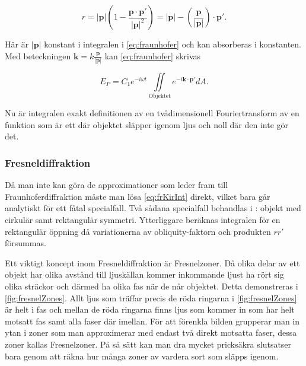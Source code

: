 \documentclass[a4paper]{article}
\begin{document}
\begin{equation}
	r = |\boldsymbol{p}|\left( 1 - \frac{\boldsymbol{p}\cdot\boldsymbol{p'}}{|\boldsymbol{p}|^2} \right) = |\boldsymbol{p}| - \left(\frac{\boldsymbol{p}}{|\boldsymbol{p}|}\right)\cdot\boldsymbol{p'}\text{.}
\end{equation}

Här är $|\boldsymbol{p}|$ konstant i integralen i \eqref{eq:fraunhofer} och kan absorberas i konstanten. Med beteckningen $\boldsymbol{k} = k \frac{\boldsymbol{p}}{|\boldsymbol{p}|}$ kan \eqref{eq:fraunhofer} skrivas

\begin{equation}
	E_P = C_1 e^{-i \omega t} \iint\limits_{\mathrm{Objektet}} {e^{-i \boldsymbol{k}\cdot\boldsymbol{p'}} dA}\text{.}
\end{equation}

Nu är integralen exakt definitionen av en tvådimensionell Fouriertransform av en funktion som är ett där objektet släpper igenom ljus och noll där den inte gör det.

\subsubsection{Fresneldiffraktion}

Då man inte kan göra de approximationer som leder fram till Fraunhoferdiffraktion måste man lösa \eqref{eq:frKirInt} direkt, vilket bara går analytiskt för ett fåtal specialfall. Två sådana specialfall behandlas i \cite{pearsonIntroOpt}: objekt med cirkulär samt rektangulär symmetri. Ytterliggare beräknas integralen för en rektangulär öppning då variationerna av obliquity-faktorn och produkten $r r'$ försummas.

Ett viktigt koncept inom Fresneldiffraktion är Fresnelzoner. Då olika delar av ett objekt har olika avstånd till ljuskällan kommer inkommande ljust ha rört sig olika sträckor och därmed ha olika fas när de når objektet. Detta demonstreras i \autoref{fig:fresnelZones}. Allt ljus som träffar precis de röda ringarna i \autoref{fig:fresnelZones} är helt i fas och mellan de röda ringarna finns ljus som kommer in som har helt motsatt fas samt alla faser där imellan. För att förenkla bilden grupperar man in ytan i zoner som man approximerar med endast två direkt motsatta faser, dessa zoner kallas Fresnelzoner. På så sätt kan man dra mycket pricksäkra slutsatser bara genom att räkna hur många zoner av vardera sort som släpps igenom.

\end{document}
